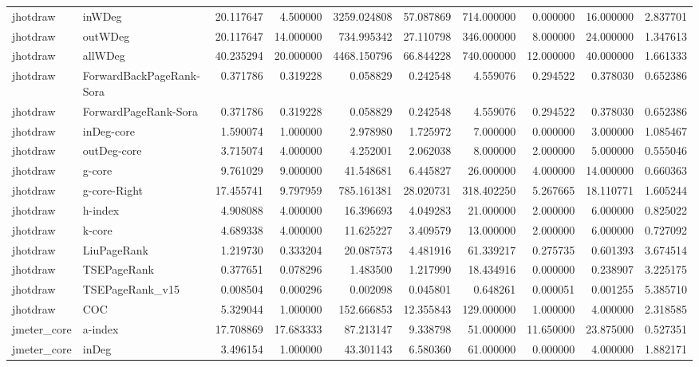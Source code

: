 \begin{tabular}{llrrrrrrrr}
jhotdraw & inWDeg & 20.117647 & 4.500000 & 3259.024808 & 57.087869 & 714.000000 & 0.000000 & 16.000000 & 2.837701 \\
jhotdraw & outWDeg & 20.117647 & 14.000000 & 734.995342 & 27.110798 & 346.000000 & 8.000000 & 24.000000 & 1.347613 \\
jhotdraw & allWDeg & 40.235294 & 20.000000 & 4468.150796 & 66.844228 & 740.000000 & 12.000000 & 40.000000 & 1.661333 \\
jhotdraw & ForwardBackPageRank-Sora & 0.371786 & 0.319228 & 0.058829 & 0.242548 & 4.559076 & 0.294522 & 0.378030 & 0.652386 \\
jhotdraw & ForwardPageRank-Sora & 0.371786 & 0.319228 & 0.058829 & 0.242548 & 4.559076 & 0.294522 & 0.378030 & 0.652386 \\
jhotdraw & inDeg-core & 1.590074 & 1.000000 & 2.978980 & 1.725972 & 7.000000 & 0.000000 & 3.000000 & 1.085467 \\
jhotdraw & outDeg-core & 3.715074 & 4.000000 & 4.252001 & 2.062038 & 8.000000 & 2.000000 & 5.000000 & 0.555046 \\
jhotdraw & g-core & 9.761029 & 9.000000 & 41.548681 & 6.445827 & 26.000000 & 4.000000 & 14.000000 & 0.660363 \\
jhotdraw & g-core-Right & 17.455741 & 9.797959 & 785.161381 & 28.020731 & 318.402250 & 5.267665 & 18.110771 & 1.605244 \\
jhotdraw & h-index & 4.908088 & 4.000000 & 16.396693 & 4.049283 & 21.000000 & 2.000000 & 6.000000 & 0.825022 \\
jhotdraw & k-core & 4.689338 & 4.000000 & 11.625227 & 3.409579 & 13.000000 & 2.000000 & 6.000000 & 0.727092 \\
jhotdraw & LiuPageRank & 1.219730 & 0.333204 & 20.087573 & 4.481916 & 61.339217 & 0.275735 & 0.601393 & 3.674514 \\
jhotdraw & TSEPageRank & 0.377651 & 0.078296 & 1.483500 & 1.217990 & 18.434916 & 0.000000 & 0.238907 & 3.225175 \\
jhotdraw & TSEPageRank_v15 & 0.008504 & 0.000296 & 0.002098 & 0.045801 & 0.648261 & 0.000051 & 0.001255 & 5.385710 \\
jhotdraw & COC & 5.329044 & 1.000000 & 152.666853 & 12.355843 & 129.000000 & 1.000000 & 4.000000 & 2.318585 \\
jmeter_core & a-index & 17.708869 & 17.683333 & 87.213147 & 9.338798 & 51.000000 & 11.650000 & 23.875000 & 0.527351 \\
jmeter_core & inDeg & 3.496154 & 1.000000 & 43.301143 & 6.580360 & 61.000000 & 0.000000 & 4.000000 & 1.882171 \\

\end{tabular}
